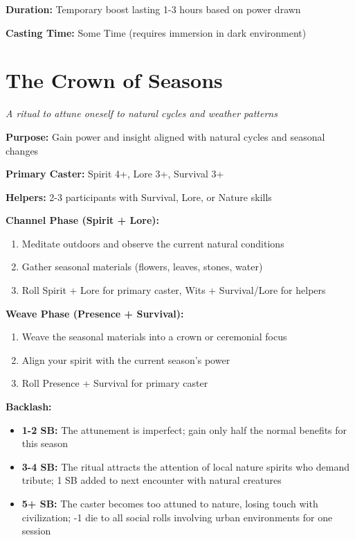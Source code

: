 \textbf{Duration:} Temporary boost lasting 1-3 hours based on power drawn

\textbf{Casting Time:} Some Time (requires immersion in dark environment)

\section*{The Crown of Seasons}
\textit{A ritual to attune oneself to natural cycles and weather patterns}

\textbf{Purpose:} Gain power and insight aligned with natural cycles and seasonal changes

\textbf{Primary Caster:} Spirit 4+, Lore 3+, Survival 3+

\textbf{Helpers:} 2-3 participants with Survival, Lore, or Nature skills

\textbf{Channel Phase (Spirit + Lore):}
\begin{enumerate}
\item Meditate outdoors and observe the current natural conditions
\item Gather seasonal materials (flowers, leaves, stones, water)
\item Roll Spirit + Lore for primary caster, Wits + Survival/Lore for helpers
\end{enumerate}

\textbf{Weave Phase (Presence + Survival):}
\begin{enumerate}
\item Weave the seasonal materials into a crown or ceremonial focus
\item Align your spirit with the current season's power
\item Roll Presence + Survival for primary caster
\end{enumerate}

\textbf{Backlash:}
\begin{itemize}
\item \textbf{1-2 SB:} The attunement is imperfect; gain only half the normal benefits for this season
\item \textbf{3-4 SB:} The ritual attracts the attention of local nature spirits who demand tribute; 1 SB added to next encounter with natural creatures
\item \textbf{5+ SB:} The caster becomes too attuned to nature, losing touch with civilization; -1 die to all social rolls involving urban environments for one session
\end{itemize}

